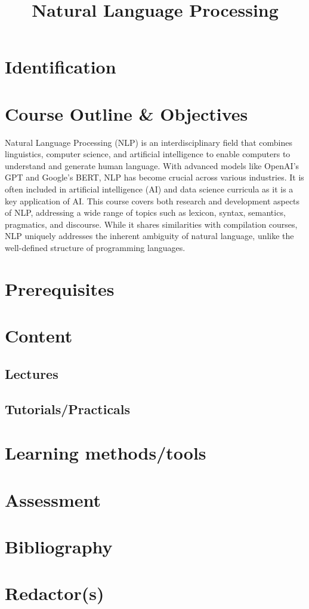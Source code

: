 \documentclass[]{esisyllabus}
\title{Natural Language Processing}
\begin{document}
	
	\section{Identification}

	\identification
	
	\section{Course Outline \& Objectives}

	Natural Language Processing (NLP) is an interdisciplinary field that combines linguistics, computer science, and artificial intelligence to enable computers to understand and generate human language. 
	With advanced models like OpenAI's GPT and Google's BERT, NLP has become crucial across various industries. 
	It is often included in artificial intelligence (AI) and data science curricula as it is a key application of AI. 
	This course covers both research and development aspects of NLP, addressing a wide range of topics such as lexicon, syntax, semantics, pragmatics, and discourse. 
	While it shares similarities with compilation courses, NLP uniquely addresses the inherent ambiguity of natural language, unlike the well-defined structure of programming languages.
	
	\objectives
	
	\section{Prerequisites}
	
	\prerequisites
	
	\section{Content}
	
	\subsection{Lectures}
	
	\chapters
	
	\subsection{Tutorials/Practicals}
	
	\practicals
	
	\section{Learning methods/tools}
	
	\methods
	
	\section{Assessment}
	
	\assessment

	\section{Bibliography}
	
	
	\nocite{*}
	\renewcommand{\bibsection}{}
	
	
	
	\section{Redactor(s)}
	
	\redactors
	
	\reviewers
	
\end{document}

